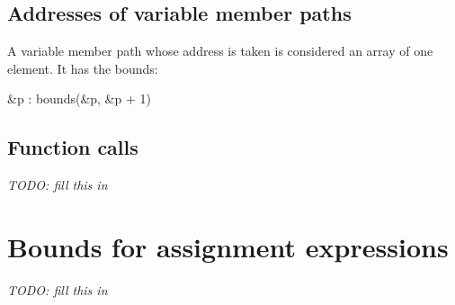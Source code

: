 \subsection{Addresses of variable member paths}\label{addresses-of-variable-member-paths}

A variable member path  whose address is taken is considered an
array of one element. It has the bounds:

\&p : bounds(\&p, \&p + 1)

\subsection{Function calls}\label{function-calls-1}

\emph{TODO: fill this in}

\section{Bounds for assignment expressions}\label{bounds-for-assignment-expressions}

\emph{TODO: fill this in}
